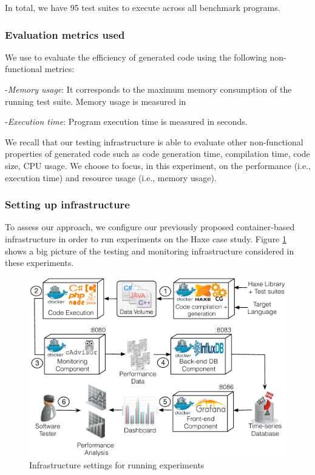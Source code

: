 In total, we have 95 test suites to execute across all benchmark programs.
\subsubsection{Evaluation metrics used}
We use to evaluate the efficiency of generated code using the following non-functional metrics:

-\textit{Memory usage}:
It corresponds to the maximum memory consumption of the running test suite. Memory usage is measured in \SI{}{\mega\byte}

-\textit{Execution time}:
Program execution time is measured in seconds.

We recall that our testing infrastructure is able to evaluate other non-functional properties of generated code such as code generation time, compilation time, code size, CPU usage. We choose to focus, in this experiment, on the performance (i.e., execution time) and resource usage (i.e., memory usage).

\subsubsection{Setting up infrastructure}

To assess our approach, we configure our previously proposed container-based infrastructure in order to run experiments on the Haxe case study.
Figure \ref{fig:settingup.pdf} shows a big picture of the testing and monitoring infrastructure considered in these experiments.

\begin{figure}[h]
	\centering
	\includegraphics[width=0.8\linewidth]{chapitre4/fig/settingup.pdf}
	\caption{Infrastructure settings for running experiments}
	\label{fig:settingup.pdf}
\end{figure}

